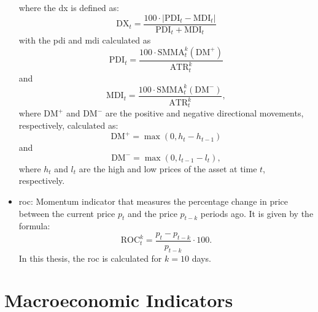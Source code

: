\begin{itemize}
    where the \acrfull{dx} is defined as:
    \begin{equation}
        \text{DX}_t = \frac{100 \cdot \left| \text{PDI}_t - \text{MDI}_t \right|}{\text{PDI}_t + \text{MDI}_t}
    \end{equation}
    with the \acrfull{pdi} and \acrfull{mdi} calculated as
    \begin{equation}
        \text{PDI}_t = \frac{100 \cdot \text{SMMA}_t^k ( \text{DM}^+ )}{\text{ATR}_t^k}
    \end{equation}
    and
    \begin{equation}
        \text{MDI}_t = \frac{100 \cdot \text{SMMA}_t^k ( \text{DM}^- )}{\text{ATR}_t^k},
    \end{equation}
    where $\text{DM}^+$ and $\text{DM}^-$ are the positive and negative directional movements, respectively, calculated as:
    \begin{equation}
        \text{DM}^+ = \max \left( 0, h_t - h_{t-1} \right)
    \end{equation}
    and
    \begin{equation}
        \text{DM}^- = \max \left( 0, l_{t-1} - l_t \right),
    \end{equation}
    where $h_t$ and $l_t$ are the high and low prices of the asset at time $t$, respectively. 
    \item \acrfull{roc}: Momentum indicator that measures the percentage change in price between the current price $p_t$ and the price $p_{t-k}$ periods ago. It is given by the formula:
    \begin{equation}
        \text{ROC}_t^k = \frac{p_t - p_{t-k}}{p_{t-k}} \cdot 100.
    \end{equation}
    In this thesis, the \acrshort{roc} is calculated for $k=10$ days.
\end{itemize}

\section{Macroeconomic Indicators} \label{sec:macroeconomic-indicators}

